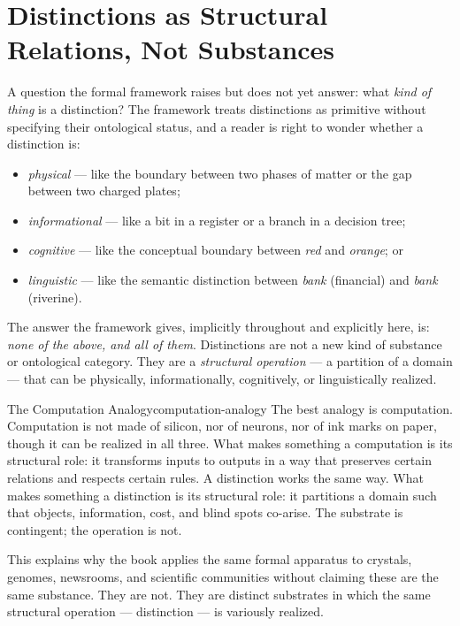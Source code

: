 \documentclass[12pt,twoside,openright]{book}
\begin{document}
\section{Distinctions as Structural Relations, Not Substances}
\label{sec:ch1-structural-relations}

A question the formal framework raises but does not yet
answer: what \emph{kind of thing} is a distinction?
The framework treats distinctions as primitive without
specifying their ontological status, and a reader is right
to wonder whether a distinction is:
\begin{itemize}[nosep]
  \item \emph{physical} --- like the boundary between two
        phases of matter or the gap between two charged
        plates;
  \item \emph{informational} --- like a bit in a register or
        a branch in a decision tree;
  \item \emph{cognitive} --- like the conceptual boundary
        between \emph{red} and \emph{orange}; or
  \item \emph{linguistic} --- like the semantic distinction
        between \emph{bank} (financial) and \emph{bank}
        (riverine).
\end{itemize}
The answer the framework gives, implicitly throughout and
explicitly here, is: \emph{none of the above, and all of
them}. Distinctions are not a new kind of substance or
ontological category. They are a \emph{structural operation}
--- a partition of a domain --- that can be physically,
informationally, cognitively, or linguistically realized.

\begin{remark}{The Computation Analogy}{computation-analogy}
  The best analogy is computation. Computation is not made
  of silicon, nor of neurons, nor of ink marks on paper,
  though it can be realized in all three. What makes
  something a computation is its structural role: it
  transforms inputs to outputs in a way that preserves
  certain relations and respects certain rules. A distinction
  works the same way. What makes something a distinction is
  its structural role: it partitions a domain such that
  objects, information, cost, and blind spots
  co-arise. The substrate is contingent; the operation is
  not.
\end{remark}

This explains why the book applies the same formal apparatus
to crystals, genomes, newsrooms, and scientific communities
without claiming these are the same substance. They are not.
They are distinct substrates in which the same structural
operation --- distinction --- is variously realized.
\end{document}

